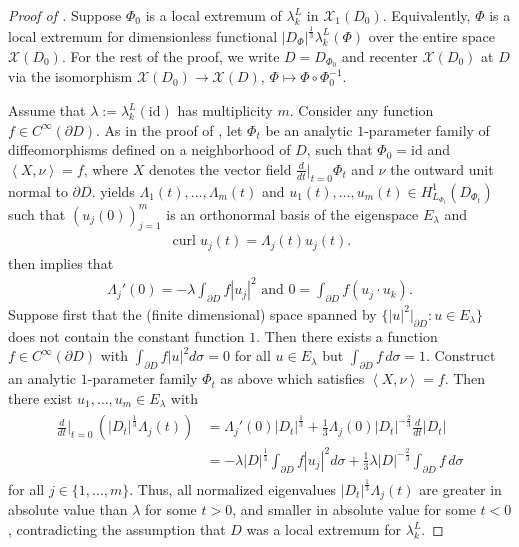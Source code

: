 \documentclass[11pt,reqno]{amsart}
\DeclareMathOperator{\curl}{curl}
\begin{document}
\begin{proof}[Proof of ]
    Suppose $\Phi_0$ is a local extremum of $\lambda_k^L$ in $\mathcal X_1(D_0)$. Equivalently, $\Phi$ is a local extremum for dimensionless functional $|D_\Phi|^{\frac13} \lambda^L_k(\Phi)$ over the entire space $\mathcal X(D_0)$. For the rest of the proof, we write $D = D_{\Phi_0}$ and recenter $\mathcal X(D_0)$ at $D$ via the isomorphism $\mathcal X(D_0) \to \mathcal X(D)$, $\Phi \mapsto \Phi \circ \Phi_0^{-1}$.
    
    Assume that $\lambda := \lambda_k^L(\mathrm{id})$ has multiplicity $m$. 
    Consider any function $f \in C^\infty(\partial D)$. As in the proof of , let $\Phi_t$ be an analytic $1$-parameter family of diffeomorphisms defined on a neighborhood of $D$, such that $\Phi_0 = \mathrm{id}$ and $\left\langle X, \nu \right\rangle = f$, where $X$ denotes the vector field $\frac{d}{dt}\rvert_{t=0} \Phi_t$ and $\nu$ the outward unit normal to $\partial D$.  yields $\Lambda_1(t),\ldots,\Lambda_m(t)$ and $u_1(t),\ldots,u_m(t) \in H^1_{L_{\Phi_t}}(D_{\Phi_t})$ such that $(u_j(0))_{j=1}^m$ is an orthonormal basis of the eigenspace $E_\lambda$ and
    \begin{align*}
        \curl u_j(t) = \Lambda_j(t) u_j(t).
    \end{align*}
     then implies that 
    \begin{align*}
        \Lambda_j'(0) = - \lambda \int_{\partial D} f |u_j|^2 \text{ and } 0 = \int_{\partial D} f (u_j \cdot u_k).
    \end{align*}
    Suppose first that the (finite dimensional) space spanned by $\{|u|^2|_{\partial D}: u \in E_\lambda\}$ does not contain the constant function $1$. Then there exists a function $f \in C^\infty(\partial D)$ with $\int_{\partial D} f |u|^2 d\sigma = 0$ for all $u \in E_\lambda$ but $\int_{\partial D} f \, d\sigma = 1$. Construct an analytic $1$-parameter family $\Phi_t$ as above which satisfies $\left\langle X, \nu \right\rangle = f$. Then there exist $u_1,\ldots,u_m \in E_\lambda$ with
    \begin{align}
        \label{eq:derivative_of_normalized_eigenvalue}
        \begin{split}
        \frac{d}{dt}\big\rvert_{t=0} \, \left( |D_t|^{\frac{1}{3}} \Lambda_j(t) \right) &= \Lambda_j'(0)|D_t|^{\frac{1}{3}} + \frac13 \Lambda_j(0)|D_t|^{-\frac{2}{3}} \frac{d}{dt} |D_t| \\
        &= - \lambda |D|^{\frac13} \int_{\partial D} f |u_j|^2 d\sigma + \frac13 \lambda |D|^{-\frac{2}{3}} \int_{\partial D} f \, d\sigma    
        \end{split}
    \end{align}
    for all $j \in \{1,\ldots,m\}$.
    Thus, all normalized eigenvalues $|D_t|^{\frac{1}{3}} \Lambda_j(t)$ are greater in absolute value than $\lambda$ for some $t > 0$, and smaller in absolute value for some $t < 0$, contradicting the assumption that $D$ was a local extremum for $\lambda_k^L$.


\end{proof}
\end{document}
